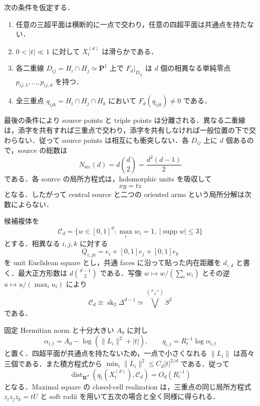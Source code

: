 \documentclass[a4paper,11pt]{ltjsarticle}
\numberwithin{equation}{section}
\theoremstyle{plain}
\theoremstyle{definition}
\theoremstyle{remark}
\newcommand{\PP}{\mathbf P}\newcommand{\CC}{\mathbf C}\newcommand{\RR}{\mathbf R}\newcommand{\ZZ}{\mathbf Z}\newcommand{\NN}{\mathbf N}
\newcommand{\supp}{\operatorname{supp}}\newcommand{\diam}{\operatorname{diam}}\newcommand{\dist}{\operatorname{dist}}
\begin{document}
\begin{assumption}\label{ass:Gd}
次の条件を仮定する．
\begin{enumerate}[label=\textup{(G$_d$\arabic*)}]
\item 任意の三超平面は横断的に一点で交わり，任意の四超平面は共通点を持たない．
\item $0<|t|\ll1$ に対して $X_t^{(d)}$ は滑らかである．
\item 各二重線 $D_{ij}=H_i\cap H_j\simeq\PP^1$ 上で
      $F_d|_{D_{ij}}$ は $d$ 個の相異なる単純零点
      $p_{ij,1},\ldots,p_{ij,d}$ を持つ．
\item 全三重点 $q_{ijk}=H_i\cap H_j\cap H_k$ において
      $F_d(q_{ijk})\ne0$ である．
\end{enumerate}
\end{assumption}

最後の条件により source points と triple points は分離される．異なる二重線は，添字を共有すれば三重点で交わり，添字を共有しなければ一般位置の下で交わらない．従って source points は相互にも衝突しない．各 $D_{ij}$ 上に $d$ 個あるので，source の総数は
\begin{equation}\label{eq:degree-d-source-count}
 N_{\mathrm{src}}(d)=d\binom d2=\frac{d^2(d-1)}2
\end{equation}
である．各 source の局所方程式は，holomorphic units を吸収して
\begin{equation}\label{eq:degree-d-source-model}
 xy=tz
\end{equation}
となる．したがって central source と二つの oriented arms という局所分解は次数によらない．

候補複体を
\begin{equation}\label{eq:Cd-definition}
 \mathcal C_d
 =\{w\in[0,1]^d:\max_iw_i=1,\ |\supp w|\le3\}
\end{equation}
とする．相異なる $i,j,k$ に対する
\[
 Q_{i;jk}=e_i+[0,1]e_j+[0,1]e_k
\]
を unit Euclidean square とし，共通 faces に沿って貼った内在距離を
$d_{\square,d}$ と書く．最大正方形数は
$d\binom{d-1}{2}$ である．写像
$w\mapsto w/(\sum_iw_i)$ とその逆 $u\mapsto u/(\max_i u_i)$ により
\begin{equation}\label{eq:Cd-topology}
 \mathcal C_d\cong\operatorname{sk}_2\Delta^{d-1}
 \simeq\bigvee^{\binom{d-1}{3}}S^2
\end{equation}
である．

固定 Hermitian norm と十分大きい $A_0$ に対し
\begin{equation}\label{eq:degree-d-raw-depths}
 \alpha_{i,t}=A_0-\log(\|L_i\|^2+|t|),
 \qquad q_{i,t}=R_t^{-1}\log\alpha_{i,t}
\end{equation}
と置く．四超平面が共通点を持たないため，一点で小さくなれる
$\|L_i\|$ は高々三個である．また積方程式から
$\min_i\|L_i\|^2\le C_d|t|^{2/d}$ である．従って
\begin{equation}\label{eq:degree-d-raw-target}
 \dist_{\RR^d}(q_t(X_t^{(d)}),\mathcal C_d)=O_d(R_t^{-1})
\end{equation}
となる．Maximal square の closed-cell realization は，三重点の同じ局所方程式
$z_iz_jz_k=tU$ と soft radii を用いて五次の場合と全く同様に得られる．
\end{document}
